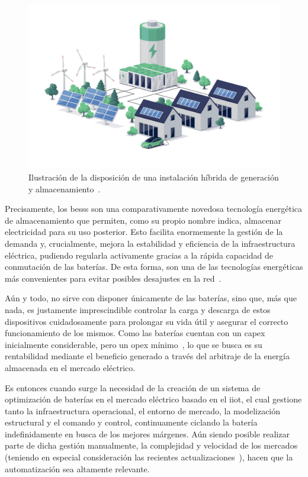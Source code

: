 \begin{figure}
  \centering
  \includegraphics[width=0.5\linewidth]{figures/instalacion-bess.jpg}
  \caption[Ilustración de la disposición de una instalación híbrida.]{Ilustración de la disposición de una instalación híbrida de generación y almacenamiento~\cite{deutz2023what}.}
  \label{fig:instalacion-bess}
\end{figure}

Precisamente, los \glspl{bess} son una comparativamente novedosa tecnología energética de almacenamiento que permiten, como su propio nombre indica, almacenar electricidad para su uso posterior. Esto facilita enormemente la gestión de la demanda y, crucialmente, mejora la estabilidad y eficiencia de la infraestructura eléctrica, pudiendo regularla activamente gracias a la rápida capacidad de conmutación de las baterías. De esta forma, son una de las tecnologías energéticas más convenientes para evitar posibles desajustes en la red~\cite{xu2014bess}.

Aún y todo, no sirve con disponer únicamente de las baterías, sino que, más que nada, es justamente imprescindible controlar la carga y descarga de estos dispositivos cuidadosamente para prolongar su vida útil y asegurar el correcto funcionamiento de los mismos. Como las baterías cuentan con un \gls{capex} inicialmente considerable, pero un \gls{opex} mínimo~\cite{larsson2018cost}, lo que se busca es su rentabilidad mediante el beneficio generado a través del arbitraje de la energía almacenada en el mercado eléctrico.

Es entonces cuando surge la necesidad de la creación de un sistema de optimización de baterías en el mercado eléctrico basado en el \gls{iiot}, el cual gestione tanto la infraestructura operacional, el entorno de mercado, la modelización estructural y el comando y control, continuamente ciclando la batería indefinidamente en busca de los mejores márgenes. Aún siendo posible realizar parte de dicha gestión manualmente, la complejidad y velocidad de los mercados (teniendo en especial consideración las recientes actualizaciones~\cite{cnmc2025resolucion, omie2025instruccion}), hacen que la automatización sea altamente relevante.

